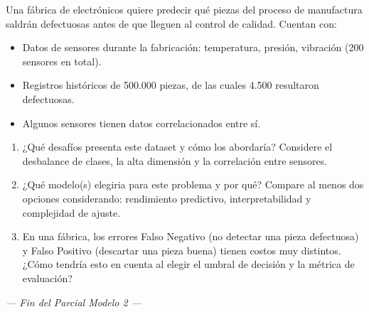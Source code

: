 \documentclass[11pt,a4paper]{article}
\begin{document}
\begin{enumerate}[label=\textbf{\arabic*.}, leftmargin=*, itemsep=10pt]
Una f\'abrica de electr\'onicos quiere predecir qu\'e piezas del proceso de manufactura saldr\'an defectuosas antes de que lleguen al control de calidad. Cuentan con:
\begin{itemize}
  \item Datos de sensores durante la fabricaci\'on: temperatura, presi\'on, vibraci\'on (200 sensores en total).
  \item Registros hist\'oricos de 500.000 piezas, de las cuales 4.500 resultaron defectuosas.
  \item Algunos sensores tienen datos correlacionados entre s\'i.
\end{itemize}

\begin{enumerate}[label=\textbf{\alph*)}]
  \item ¿Qu\'e desaf\'ios presenta este dataset y c\'omo los abordar\'ia? Considere el desbalance de clases, la alta dimensi\'on y la correlaci\'on entre sensores.
  \vspace{4cm}
  \item ¿Qu\'e modelo(s) elegiria para este problema y por qu\'e? Compare al menos dos opciones considerando: rendimiento predictivo, interpretabilidad y complejidad de ajuste.
  \vspace{3.5cm}
  \item En una f\'abrica, los errores Falso Negativo (no detectar una pieza defectuosa) y Falso Positivo (descartar una pieza buena) tienen costos muy distintos. ¿C\'omo tendr\'ia esto en cuenta al elegir el umbral de decisi\'on y la m\'etrica de evaluaci\'on?
  \vspace{3.5cm}
\end{enumerate}

\end{enumerate}

\vspace{1cm}
\begin{center}
\textit{--- Fin del Parcial Modelo 2 ---}
\end{center}
\end{document}
